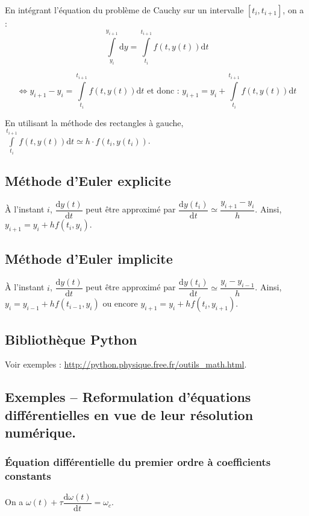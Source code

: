 \begin{resultat}
En intégrant l'équation du problème de Cauchy sur un intervalle $[t_i, t_{i+1}]$, on a : 
$$
\int\limits_{y_i}^{y_{i+1}} \text{d}y = \int\limits_{t_i}^{t_{i+1}} f(t,y(t)) \text{d}t 
$$

$$
\Leftrightarrow 
y_{i+1} - y_i = \int\limits_{t_i}^{t_{i+1}} f(t,y(t)) \text{d}t  \text{ et donc : }  y_{i+1}= y_i + \int\limits_{t_i}^{t_{i+1}} f(t,y(t)) \text{d}t 
$$

 En utilisant la méthode des rectangles à gauche, $\int\limits_{t_i}^{t_{i+1}} f(t,y(t)) \text{d}t  \simeq h \cdot f(t_i,y(t_i)) $.

\end{resultat}


\subsection{Méthode d'Euler explicite}

À l'instant $i$, $\dfrac{\text{d}y(t)}{\text{d}t}$ peut être approximé par 
$\dfrac{\text{d}y(t_i)}{\text{d}t} \simeq \dfrac{y_{i+1}-y_i}{h}$.
Ainsi, $y_{i+1} = y_i +h  f(t_i,y_i)$.

\subsection*{Méthode d'Euler implicite}
À l'instant $i$, $\dfrac{\text{d}y(t)}{\text{d}t}$ peut être approximé par 
$\dfrac{\text{d}y(t_{i})}{\text{d}t} \simeq \dfrac{y_{i}-y_{i-1}}{h}$.
Ainsi, $y_{i} = y_{i-1} +h  f(t_{i-1},y_{i})$ ou encore $y_{i+1} = y_{i} +h  f(t_{i},y_{i+1})$.
\subsection*{Bibliothèque Python}

Voir exemples : \url{http://python.physique.free.fr/outils_math.html}.


\subsection{Exemples -- Reformulation d'équations différentielles en vue de leur résolution numérique.}
\subsubsection{Équation différentielle du premier ordre à coefficients constants}
On a $\omega(t) + \tau \dfrac{\text{d} \omega(t)}{\text{d}t} = \omega_c $.

